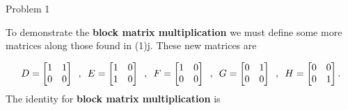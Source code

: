\begin{problem}{Problem 1}
\begin{Highlight}[Solution]
        To demonstrate the \textbf{block matrix multiplication} we must define some more matrices along those found in (1)j. These new matrices are 

        \begin{equation}
            D = 
            \begin{bmatrix}
                1 & 1 \\
                0 & 0 \\
            \end{bmatrix}
            \hspace*{5pt} , \hspace*{5pt}
            E = 
            \begin{bmatrix}
                1 & 0 \\
                1 & 0 \\
            \end{bmatrix}
            \hspace*{5pt} , \hspace*{5pt}
            F = 
            \begin{bmatrix}
                1 & 0 \\
                0 & 0 \\
            \end{bmatrix}
            \hspace*{5pt} , \hspace*{5pt}
            G = 
            \begin{bmatrix}
                0 & 1 \\
                0 & 0 \\
            \end{bmatrix}
            \hspace*{5pt} , \hspace*{5pt}
            H = 
            \begin{bmatrix}
                0 & 0 \\
                0 & 1 \\
            \end{bmatrix}.
        \end{equation}
        The identity for \textbf{block matrix multiplication} is 


\end{Highlight}
\end{problem}
